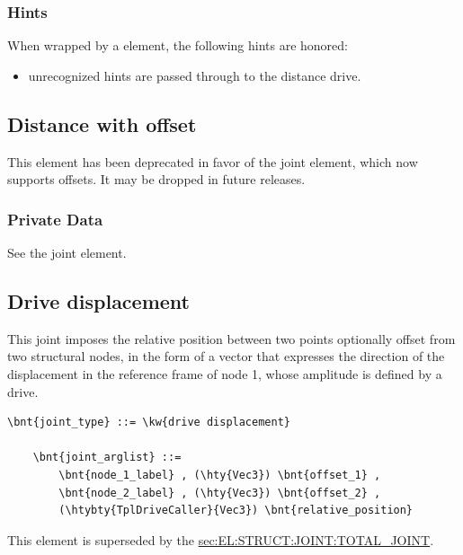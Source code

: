 \subsubsection{Hints}
When wrapped by a  element, the following hints are honored:
\begin{itemize}
\item unrecognized hints are passed through to the distance drive.
\end{itemize}



\subsection{Distance with offset}
This element has been deprecated in favor of the 
joint element, which now supports offsets.
It may be dropped in future releases.

\subsubsection{Private Data}
See the  joint element.



\subsection{Drive displacement}
\label{sec:EL:JOINT:DRIVEDISPLACEMENT}
This joint imposes the relative position between two points 
optionally offset from two structural nodes,
in the form of a vector that expresses the direction of the displacement
in the reference frame of node 1, whose amplitude is defined by a drive.
\begin{Verbatim}[commandchars=\\\{\}]
    \bnt{joint_type} ::= \kw{drive displacement}

    \bnt{joint_arglist} ::= 
        \bnt{node_1_label} , (\hty{Vec3}) \bnt{offset_1} ,
        \bnt{node_2_label} , (\hty{Vec3}) \bnt{offset_2} ,
        (\htybty{TplDriveCaller}{Vec3}) \bnt{relative_position}
\end{Verbatim}
This element is superseded by the
\hyperref{\kw{total joint}}{\kw{total joint}, see Section~}{}{sec:EL:STRUCT:JOINT:TOTAL_JOINT}.

